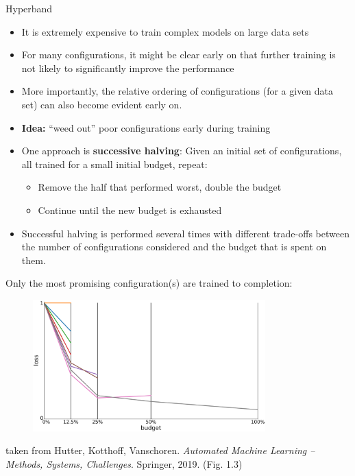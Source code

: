 \documentclass[11pt,compress,t,notes=noshow, xcolor=table]{beamer}
\begin{document}
\begin{vbframe}{Hyperband}

\begin{itemize}
\item It is extremely expensive to train complex models on large data sets
\item For many configurations, it might be clear early on that further training is not likely to significantly improve the performance
\item More importantly, the relative ordering of configurations (for a given data set) can also become evident early on. 
\item \textbf{Idea:} \enquote{weed out} poor configurations early during training
\item One approach is \textbf{successive halving}: Given an initial set of configurations, all trained for a small initial budget, repeat:
  \begin{itemize}
\item Remove the half that performed worst, double the budget
\item Continue until the new budget is exhausted
\end{itemize}  
\item Successful halving is performed several times with different trade-offs between the number of configurations considered and the budget that is spent on them. 
\end{itemize}

\framebreak 

Only the most promising configuration(s) are trained to completion: 
  
  \begin{center}
\begin{figure}
\includegraphics[width=0.8\textwidth]{figure_man/hyperband3.png}
\end{figure}
\end{center}
\tiny taken from Hutter, Kotthoff, Vanschoren. \textit{Automated Machine Learning -- Methods, Systems, Challenges}. Springer, 2019. (Fig. 1.3)
\end{vbframe}
\end{document}
